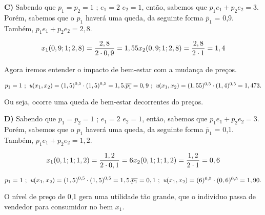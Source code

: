 \begin{flushleft}
\singlespacing

\textbf{C)} Sabendo que $p_{1} = p_{2} = 1$ ; $\textit{e}_{1} = 2$  $\textit{e}_{2} = 1$, então, sabemos que $p_{1}\textit{e}_{1} + p_{2}\textit{e}_{2} = 3$. Porém, sabemos que o $p_{1}$ haverá uma queda, da seguinte forma $\overline{p}_{1}$ = 0,9. Também, $p_{1}\textit{e}_{1} + p_{2}\textit{e}_{2} = 2,8$.

\begin{equation}
x_{1}(0,9;1;2,8) = \dfrac{2,8}{2 \cdot 0,9} = 1,55
$$\\$$
x_{2}(0,9;1;2,8) = \dfrac{2,8}{2 \cdot 1} = 1,4
\end{equation}

\begin{center}
Agora iremos entender o impacto de bem-estar com a mudança de preços.
\end{center}

\begin{equation}
p_{1} = 1 \ ; \ \textit{u}(x_{1}, x_{2}) = (1,5)^{0,5} \cdot (1,5)^{0,5} = 1,5. 
$$\\$$
\overline{p_{1}} = 0,9 \ ; \ \textit{u}(x_{1}, x_{2}) = (1,55)^{0,5} \cdot (1,4)^{0,5} = 1,473.
\end{equation}

\begin{center}
Ou seja, ocorre uma queda de bem-estar decorrentes do preços.
\end{center}

\singlespacing

\textbf{D)}  Sabendo que $p_{1} = p_{2} = 1$ ; $\textit{e}_{1} = 2$  $\textit{e}_{2} = 1$, então, sabemos que $p_{1}\textit{e}_{1} + p_{2}\textit{e}_{2} = 3$. Porém, sabemos que o $p_{1}$ haverá uma queda, da seguinte forma $\overline{p}_{1}$ = 0,1. Também, $p_{1}\textit{e}_{1} + p_{2}\textit{e}_{2} = 1,2$.

\begin{equation}
x_{1}(0,1;1;1,2) = \dfrac{1,2}{2 \cdot 0,1} = 6
$$\\$$
x_{2}(0,1;1;1,2) = \dfrac{1,2}{2 \cdot 1} = 0,6
\end{equation}

\begin{equation}
p_{1} = 1 \ ; \ \textit{u}(x_{1}, x_{2}) = (1,5)^{0,5} \cdot (1,5)^{0,5} = 1,5. 
$$\\$$
\overline{p_{1}} = 0,1 \ ; \ \textit{u}(x_{1}, x_{2}) = (6)^{0,5} \cdot (0,6)^{0,5} = 1,90.
\end{equation}

\begin{center}
O nível de preço de 0,1 gera uma utilidade tão grande, que o individuo passa de vendedor para consumidor no bem $x_{1}$.
\end{center}



\end{flushleft}
